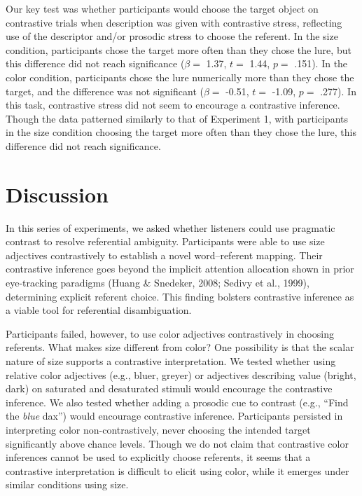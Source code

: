 \documentclass[10pt, letterpaper]{article}
\begin{document}
Our key test was whether participants would choose the target object on
contrastive trials when description was given with contrastive stress,
reflecting use of the descriptor and/or prosodic stress to choose the
referent. In the size condition, participants chose the target more
often than they chose the lure, but this difference did not reach
significance (\(\beta =\) 1.37, \(t =\) 1.44, \(p =\) .151). In the
color condition, participants chose the lure numerically more than they
chose the target, and the difference was not significant (\(\beta =\)
-0.51, \(t =\) -1.09, \(p =\) .277). In this task, contrastive stress
did not seem to encourage a contrastive inference. Though the data
patterned similarly to that of Experiment 1, with participants in the
size condition choosing the target more often than they chose the lure,
this difference did not reach significance.

\section{Discussion}\label{discussion}

In this series of experiments, we asked whether listeners could use
pragmatic contrast to resolve referential ambiguity. Participants were
able to use size adjectives contrastively to establish a novel
word--referent mapping. Their contrastive inference goes beyond the
implicit attention allocation shown in prior eye-tracking paradigms
(Huang \& Snedeker, 2008; Sedivy et al., 1999), determining explicit
referent choice. This finding bolsters contrastive inference as a viable
tool for referential disambiguation.

Participants failed, however, to use color adjectives contrastively in
choosing referents. What makes size different from color? One
possibility is that the scalar nature of size supports a contrastive
interpretation. We tested whether using relative color adjectives (e.g.,
bluer, greyer) or adjectives describing value (bright, dark) on
saturated and desaturated stimuli would encourage the contrastive
inference. We also tested whether adding a prosodic cue to contrast
(e.g., ``Find the \emph{blue} dax'') would encourage contrastive
inference. Participants persisted in interpreting color
non-contrastively, never choosing the intended target significantly
above chance levels. Though we do not claim that contrastive color
inferences cannot be used to explicitly choose referents, it seems that
a contrastive interpretation is difficult to elicit using color, while
it emerges under similar conditions using size.
\end{document}
